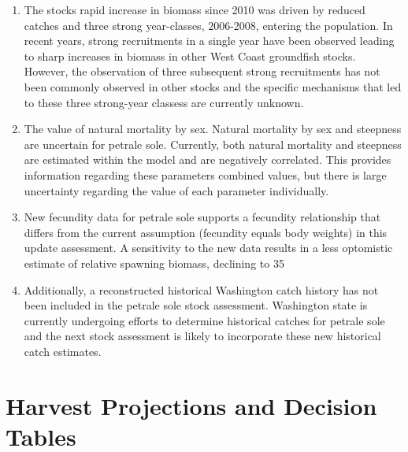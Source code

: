 \documentclass[12pt,]{article}
\begin{document}
\begin{enumerate}

\item The stocks rapid increase in biomass since 2010 was driven by reduced catches and three strong year-classes, 2006-2008, entering the population.  In recent years, strong recruitments in a single year have been observed leading to sharp increases in biomass in other West Coast groundfish stocks. However, the observation of three subsequent strong recruitments has not been commonly observed in other stocks and the specific mechanisms that led to these three strong-year classess are currently unknown. 

\item The value of natural mortality by sex.    Natural mortality by sex and steepness are uncertain for petrale sole.  Currently, both natural mortality and steepness are estimated within the model and are negatively correlated.  This provides information regarding these parameters combined values, but there is large uncertainty regarding the value of each parameter individually.

\item New fecundity data for petrale sole supports a fecundity relationship that differs from the current assumption (fecundity equals body weights) in this update assessment. A sensitivity to the new data results in a less optomistic estimate of relative spawning biomass, declining to 35%

\item Additionally, a reconstructed historical Washington catch history has not been included in the petrale sole stock assessment.  Washington state is currently undergoing efforts to determine historical catches for petrale sole and the next stock assessment is likely to incorporate these new historical catch estimates. 

\end{enumerate}

\section{Harvest Projections and Decision
Tables}\label{harvest-projections-and-decision-tables}
\end{document}
